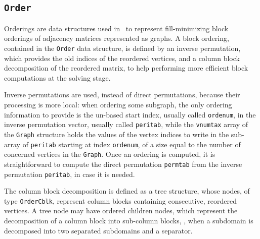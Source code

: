 \subsection{\texttt{Order}}
\label{sec-data-order}

Orderings are data structures used in \scotch\ to represent
fill-minimizing block orderings of adjacency matrices represented as
graphs. A block ordering, contained in the \texttt{Order} data
structure, is defined by an inverse permutation, which provides the
old indices of the reordered vertices, and a column block
decomposition of the reordered matrix, to help performing more
efficient block computations at the solving stage.

Inverse permutations are used, instead of direct permutations, because
their processing is more local: when ordering some subgraph, the only
ordering information to provide is the un-based start index, usually
called \texttt{ordenum}, in the inverse permutation vector, usually
called \texttt{peritab}, while the \texttt{vnumtax} array of the
\texttt{Graph} structure holds the values of the vertex indices to
write in the sub-array of \texttt{peritab} starting at index
\texttt{ordenum}, of a size equal to the number of concerned vertices
in the \texttt{Graph}. Once an ordering is computed, it is
straightforward to compute the direct permutation \texttt{permtab}
from the inverse permutation \texttt{peritab}, in case it is needed.

The column block decomposition is defined as a tree structure, whose
nodes, of type \texttt{Order\lbt Cblk}, represent column blocks
containing consecutive, reordered vertices. A tree node may have
ordered children nodes, which represent the decomposition of a column
block into sub-column blocks, \eg, when a subdomain is decomposed into
two separated subdomains and a separator.

